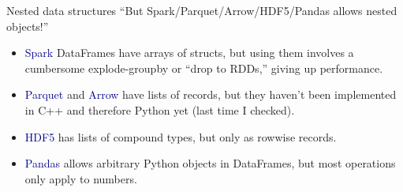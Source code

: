 \documentclass[aspectratio=169]{beamer}
\begin{document}
\begin{frame}{Nested data structures}
\large
\vspace{0.5 cm}
{\Large ``But Spark/Parquet/Arrow/HDF5/Pandas allows nested objects!''}

\vspace{0.5 cm}

\vspace{0.25 cm}
\begin{itemize}\setlength{\itemsep}{0.25 cm}
\item<3-> \textcolor{darkblue}{Spark} DataFrames have arrays of structs, but using them involves a cumbersome explode-groupby or ``drop to RDDs,'' giving up performance.
\item<4-> \textcolor{darkblue}{Parquet} and \textcolor{darkblue}{Arrow} have lists of records, but they haven't been implemented in C++ and therefore Python yet (last time I checked).
\item<5-> \textcolor{darkblue}{HDF5} has lists of compound types, but only as rowwise records.
\item<6-> \textcolor{darkblue}{Pandas} allows arbitrary Python objects in DataFrames, but most operations only apply to numbers.
\end{itemize}
\end{frame}
\end{document}
